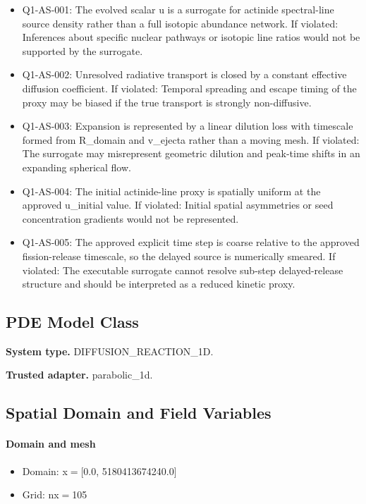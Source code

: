 \documentclass[11pt]{article}
\begin{document}
\begin{itemize}\raggedright
\item Q1-AS-001: The evolved scalar u is a surrogate for actinide spectral-line source density rather than a full isotopic abundance network. If violated: Inferences about specific nuclear pathways or isotopic line ratios would not be supported by the surrogate.
\item Q1-AS-002: Unresolved radiative transport is closed by a constant effective diffusion coefficient. If violated: Temporal spreading and escape timing of the proxy may be biased if the true transport is strongly non-diffusive.
\item Q1-AS-003: Expansion is represented by a linear dilution loss with timescale formed from R\_\allowbreak{}domain and v\_\allowbreak{}ejecta rather than a moving mesh. If violated: The surrogate may misrepresent geometric dilution and peak-time shifts in an expanding spherical flow.
\item Q1-AS-004: The initial actinide-line proxy is spatially uniform at the approved u\_\allowbreak{}initial value. If violated: Initial spatial asymmetries or seed concentration gradients would not be represented.
\item Q1-AS-005: The approved explicit time step is coarse relative to the approved fission-release timescale, so the delayed source is numerically smeared. If violated: The executable surrogate cannot resolve sub-step delayed-release structure and should be interpreted as a reduced kinetic proxy.
\end{itemize}

\subsection{PDE Model Class}

\noindent\textbf{System type.} DIFFUSION\_REACTION\_1D.

\noindent\textbf{Trusted adapter.} parabolic\_1d.

\subsection{Spatial Domain and Field Variables}

\paragraph{Domain and mesh}
\begin{itemize}\raggedright
\item Domain: x\ensuremath{=}[0.0, 5180413674240.0]
\item Grid: nx\ensuremath{=}105
\end{itemize}
\end{document}

